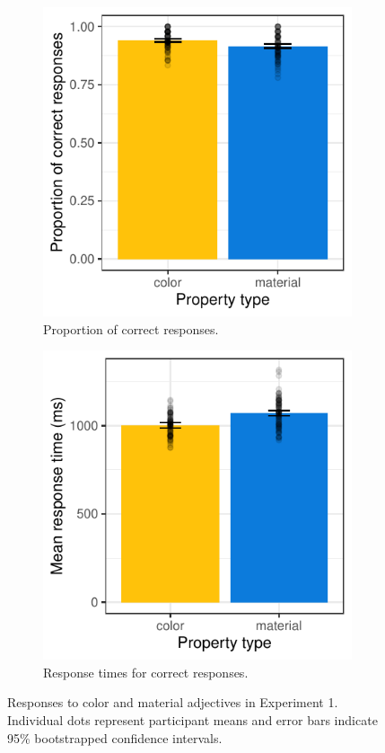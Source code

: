 \documentclass[12pt,letterpaper]{article}
\begin{document}
\begin{figure}[ht]
\centering
\begin{subfigure}{.4\textwidth}
\centering
\includegraphics[width=\textwidth]{plots/exp1_proportion.pdf}
\caption{Proportion of correct responses.}
\label{fig:exp1_a}
\end{subfigure} \hspace{9mm}
\begin{subfigure}{.4 \textwidth}
\centering
\includegraphics[width=\textwidth]{plots/exp1_rt.pdf}
\caption{Response times for correct responses.}
\label{fig:exp1_b}
\end{subfigure}
\caption{Responses to color and material adjectives in Experiment 1. Individual dots represent participant means and error bars indicate 95\% bootstrapped confidence intervals.}
\label{fig:exp1}
\end{figure}  
\end{document}
